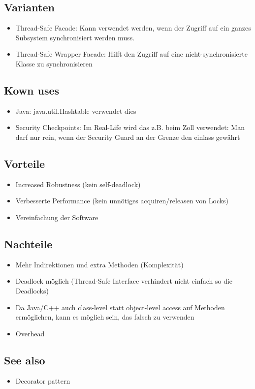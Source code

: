 \subsection*{Varianten}

\begin{itemize}
	\item Thread-Safe Facade: Kann verwendet werden, wenn der Zugriff auf ein ganzes Subsystem synchronisiert werden muss.
	\item Thread-Safe Wrapper Facade: Hilft den Zugriff auf eine nicht-synchronisierte Klasse zu synchronisieren
\end{itemize}

\subsection*{Kown uses}

\begin{itemize}
	\item Java: java.util.Hashtable verwendet dies
	\item Security Checkpoints: Im Real-Life wird das z.B. beim Zoll verwendet: Man darf nur rein, wenn der Security Guard an der Grenze den einlass gewährt
\end{itemize}

\subsection*{Vorteile}

\begin{itemize}
	\item Increased Robustness (kein self-deadlock)
	\item Verbesserte Performance (kein unnötiges acquiren/releasen von Locks)
	\item Vereinfachung der Software
\end{itemize}

\subsection*{Nachteile}

\begin{itemize}
	\item Mehr Indirektionen und extra Methoden (Komplexität)
	\item Deadlock möglich (Thread-Safe Interface verhindert nicht einfach so die Deadlocks)
	\item Da Java/C++ auch class-level statt object-level access auf Methoden ermöglichen, kann es möglich sein, das falsch zu verwenden
	\item Overhead
\end{itemize}

\subsection*{See also}

\begin{itemize}
	\item Decorator pattern
\end{itemize}

